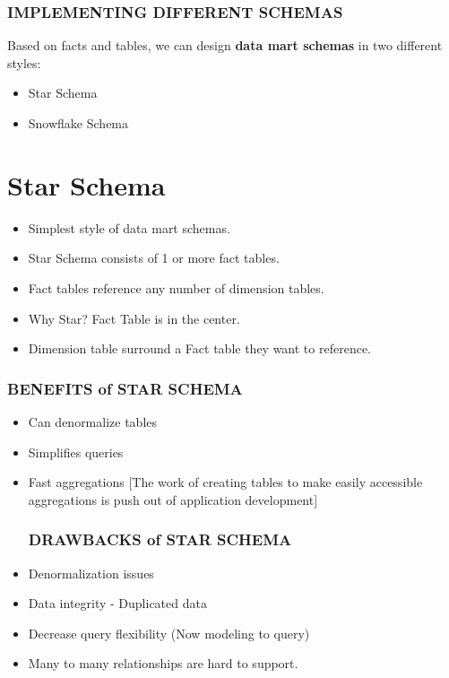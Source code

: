 \documentclass[
	paper=a4,%
	pagesize,%
	8pt, fleqn,%
	headings=small,%
	notitlepage,%
	parskip=never]%
	{scrreprt}
\begin{document}
\begin{multicols*}{3}
\subsubsection*{IMPLEMENTING DIFFERENT SCHEMAS}
Based on facts and tables, we can design \textbf{data mart schemas} in two different styles:
\begin{itemize}
\item Star Schema
\item Snowflake Schema
\end{itemize}

\section{Star Schema}
\begin{itemize}
\item Simplest style of data mart schemas.
\item Star Schema consists of 1 or more fact tables.
\item Fact tables reference any number of dimension tables.
\item Why Star? Fact Table is in the center.
\item Dimension table surround a Fact table they want to reference.
\end{itemize}

\subsubsection*{BENEFITS of STAR SCHEMA}
\begin{itemize}
\item Can denormalize tables
\item Simplifies queries
\item Fast aggregations [The work of creating tables to make easily accessible aggregations is push out of application development]

\subsubsection*{DRAWBACKS of STAR SCHEMA}
\item Denormalization issues
\item Data integrity - Duplicated data
\item Decrease query flexibility (Now modeling to query)
\item Many to many relationships are hard to support.
\end{itemize}


\end{multicols*}
\end{document}
